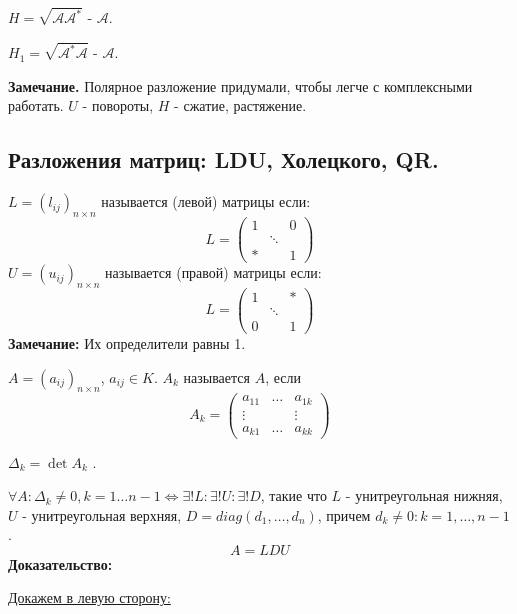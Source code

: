 $H  =\sqrt{\mathcal{A}\mathcal{A}^*}$ -  $\mathcal{A}$.
 
$H_1  =\sqrt{\mathcal{A}^*\mathcal{A}}$ -  $\mathcal{A}$.



\textbf{Замечание.} Полярное разложение придумали, чтобы легче с комплексными работать. $U$ - повороты, $H$ - сжатие, растяжение. 

\pagebreak
\subsection{Разложения матриц: LDU, Холецкого, QR.}

 $L = (l_{ij})_{n\times n}$  называется  (левой) матрицы если:
$$L = \begin{pmatrix}
    1 & & 0\\
    & \ddots & \\
    * &  & 1 
\end{pmatrix}$$
 $U = (u_{ij})_{n\times n}$  называется  (правой) матрицы если: 
$$L = \begin{pmatrix}
    1 & & *\\
    & \ddots & \\
    0 &  & 1 
\end{pmatrix}$$
\textbf{Замечание:} Их определители равны 1.

 $A = (a_{ij})_{n \times n}$, $a_{ij} \in K$. $A_k$ называется  $A$, если
$$A_k = \begin{pmatrix}
    a_{11} & \ldots & a_{1k}\\
    \vdots & & \vdots \\
    a_{k1} & \ldots & a_{kk}
\end{pmatrix}$$

$\Delta_k = \det A_k $ .



$\forall A : \Delta_k \neq 0 , k = 1\ldots n-1 \Leftrightarrow \exists ! L : \exists! U: \exists ! D $, такие что $L$ - унитреугольная нижняя, $U$ - унитреугольная верхняя, $D = diag (d_1,\ldots, d_n)$, причем $d_k \neq 0: k = 1,\ldots,n-1$.
$$A = LDU$$
\textbf{Доказательство:}

    \uline{Докажем в левую сторону:}

